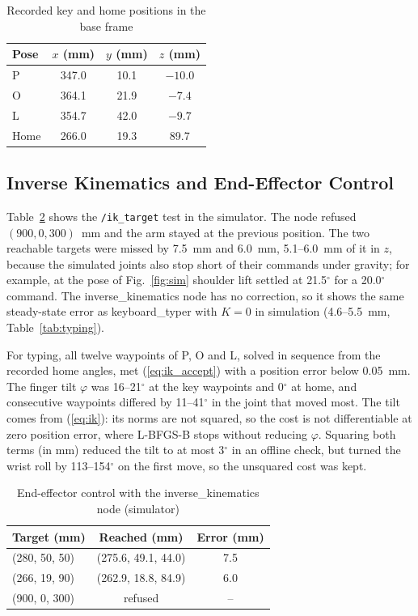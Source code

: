 \documentclass[letterpaper, 10 pt, conference]{ieeeconf}
\begin{document}
\begin{table}[t]
\caption{Recorded key and home positions in the base frame}
\label{tab:keys}
\begin{center}
\begin{tabular}{lccc}
\toprule
Pose & $x$ (mm) & $y$ (mm) & $z$ (mm) \\
\midrule
P    & 347.0 & 10.1 & $-10.0$ \\
O    & 364.1 & 21.9 & $-7.4$ \\
L    & 354.7 & 42.0 & $-9.7$ \\
Home & 266.0 & 19.3 & 89.7 \\
\bottomrule
\end{tabular}
\end{center}
\end{table}

\subsection{Inverse Kinematics and End-Effector Control}
Table~\ref{tab:ik} shows the \texttt{/ik\_target} test in the simulator. The node refused $(900, 0, 300)$~mm
and the arm stayed at the previous position. The two reachable targets were missed by 7.5~mm and 6.0~mm,
5.1--6.0~mm of it in $z$, because the simulated joints also stop short of their commands under gravity; for
example, at the pose of Fig.~\ref{fig:sim} shoulder lift settled at 21.5$^\circ$ for a 20.0$^\circ$ command. The inverse\_kinematics node has no
correction, so it shows the same steady-state error as keyboard\_typer with $K = 0$ in simulation
(4.6--5.5~mm, Table~\ref{tab:typing}).

For typing, all twelve waypoints of P, O and L, solved in sequence from the recorded home angles, met
(\ref{eq:ik_accept}) with a position error below 0.05~mm. The finger tilt $\varphi$ was 16--21$^\circ$ at the
key waypoints and 0$^\circ$ at home, and consecutive waypoints differed by 11--41$^\circ$ in the joint that moved
most. The tilt comes from (\ref{eq:ik}): its norms are not squared, so the cost is not differentiable at
zero position error, where L-BFGS-B stops without reducing $\varphi$. Squaring both terms (in mm) reduced the
tilt to at most 3$^\circ$ in an offline check, but turned the wrist roll by 113--154$^\circ$ on the first move,
so the unsquared cost was kept.

\begin{table}[t]
\caption{End-effector control with the inverse\_kinematics node (simulator)}
\label{tab:ik}
\begin{center}
\begin{tabular}{lcc}
\toprule
Target (mm) & Reached (mm) & Error (mm) \\
\midrule
(280, 50, 50)  & (275.6, 49.1, 44.0) & 7.5 \\
(266, 19, 90)  & (262.9, 18.8, 84.9) & 6.0 \\
(900, 0, 300)  & refused             & -- \\
\bottomrule
\end{tabular}
\end{center}
\end{table}
\end{document}
